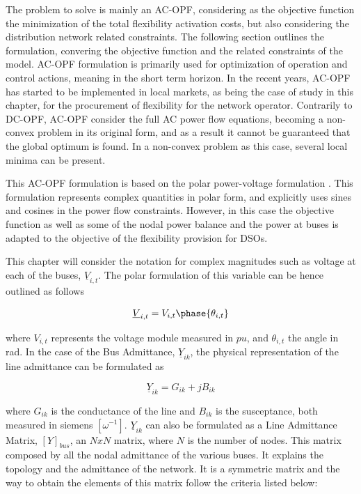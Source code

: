 The problem to solve is mainly an AC-OPF, considering as the objective function the minimization of the total flexibility activation costs, but also considering the distribution network related constraints. The following section outlines the formulation, convering the objective function and the related constraints of the model. AC-OPF formulation is primarily used for optimization of operation and control actions, meaning in the short term horizon. In the recent years, AC-OPF has started to be implemented in local markets, as being the case of study in this chapter, for the procurement of flexibility for the network operator. Contrarily to DC-OPF, AC-OPF consider the full AC power flow equations, becoming a non-convex problem in its original form, and as a result it cannot be guaranteed that the global optimum is found. In a non-convex problem as this case, several local minima can be present. 

This AC-OPF formulation is based  on the polar power-voltage formulation \cite{OPF_Formulation}. This formulation represents complex quantities in polar form, and explicitly uses sines and cosines in the power flow constraints. However, in this case the objective function as well as some of the nodal power balance and the power at buses is adapted to the objective of the flexibility provision for DSOs.

This chapter will consider the notation for complex magnitudes such as voltage at each of the buses, $\underline{V}_{i,t}$. The polar formulation of this variable can be hence outlined as follows

\begin{equation}
\underline{V}_{i,t} = V_{i,t} \phase{\theta_{i,t}}
\end{equation}

where $V_{i,t}$ represents the voltage module measured in $pu$, and $\theta_{i,t}$ the angle in rad. In the case of the Bus Admittance, $\underline{Y}_{ik}$, the physical representation of the line admittance can be formulated as

\begin{equation}
\underline{Y}_{ik} = G_{ik} + jB_{ik}
\end{equation}

where $G_{ik}$ is the conductance of the line and $B_{ik}$ is the susceptance, both measured in siemens $[\omega^{-1}]$. $\underline{Y}_{ik}$ can also be formulated as a Line Admittance Matrix, $[Y]_{bus}$, an $N x N$ matrix, where $N$ is the number of nodes. This matrix composed by all the nodal admittance of the various buses. It explains the topology and the admittance of the network. It is a symmetric matrix and the way to obtain the elements of this matrix follow the criteria listed below:

